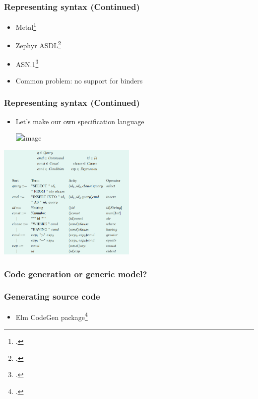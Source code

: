 \documentclass[t,24pt,aspectratio=169]{beamer}
\begin{document}
\begin{frame}
    \frametitle{Representing syntax (Continued)}
    \begin{itemize}
        \item Metal\footcite{metal}
        \pause
        \item Zephyr ASDL\footcite{zephyr}
        \pause
        \item ASN.1\footcite{asn1}
              \pause
        \item Common problem: no support for binders
    \end{itemize}
\end{frame}

\begin{frame}
    \frametitle{Representing syntax (Continued)}
    \begin{multicols}{2}
        \begin{itemize}
            \item Let's make our own specification language
                  \vspace{1cm}

                  \includegraphics<2->[width=0.45\textwidth]{img/spec-lang-parseable-ex.png}
        \end{itemize}

        \columnbreak
        \includegraphics[width=0.5\textwidth]{img/spec-lang-ex.png}
    \end{multicols}

\end{frame}

\begin{frame}[hvid]
    \frametitle{Code generation or generic model?}
\end{frame}

\begin{frame}[hvid]
    \frametitle{Generating source code}
    \begin{itemize}
        \item Elm CodeGen package\footcite{elm-codegen-package}
    \end{itemize}
\end{frame}
\end{document}
